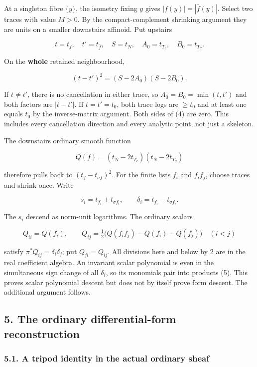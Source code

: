 \documentclass[
  11pt,
]{article}
\begin{document}
At a singleton fibre \(\{y\}\), the isometry fixing \(y\) gives
\(|f(y)|=|\bar f(y)|\). Select two traces with value \(M>0\). By the
compact-complement shrinking argument they are units on a smaller
downstairs affinoid. Put upstairs

\[t=t_f,\quad t'=t_{\bar f},\quad S=t_N,\quad A_0=t_{T_c},\quad B_0=t_{T_d}.\]

On the \textbf{whole} retained neighbourhood,

\[ (t-t')^2=(S-2A_0)(S-2B_0). \tag{4}\]

If \(t\ne t'\), there is no cancellation in either trace, so
\(A_0=B_0=\min(t,t')\) and both factors are \(|t-t'|\). If \(t=t'=t_0\),
both trace logs are \(\geq t_0\) and at least one equals \(t_0\) by the
inverse-matrix argument. Both sides of (4) are zero. This includes every
cancellation direction and every analytic point, not just a skeleton.

The downstairs ordinary smooth function

\[Q(f)=(t_N-2t_{T_c})(t_N-2t_{T_d})\]

therefore pulls back to \((t_f-t_{\sigma f})^2\). For the finite lists
\(f_i\) and \(f_if_j\), choose traces and shrink once. Write

\[s_i=t_{f_i}+t_{\sigma f_i},\qquad \delta_i=t_{f_i}-t_{\sigma f_i}.\]

The \(s_i\) descend as norm-unit logarithms. The ordinary scalars

\[Q_{ii}=Q(f_i),\qquad Q_{ij}=\tfrac12\bigl(Q(f_if_j)-Q(f_i)-Q(f_j)\bigr)\quad(i<j) \tag{5}\]

satisfy \(\pi^*Q_{ij}=\delta_i\delta_j\); put \(Q_{ji}=Q_{ij}\). All
divisions here and below by 2 are in the real coefficient algebra. An
invariant scalar polynomial is even in the simultaneous sign change of
all \(\delta_i\), so its monomials pair into products (5). This proves
scalar polynomial descent but does not by itself prove form descent. The
additional argument follows.

\subsection{5. The ordinary differential-form
reconstruction}\label{the-ordinary-differential-form-reconstruction}

\subsubsection{5.1. A tripod identity in the actual ordinary
sheaf}\label{a-tripod-identity-in-the-actual-ordinary-sheaf}
\end{document}
